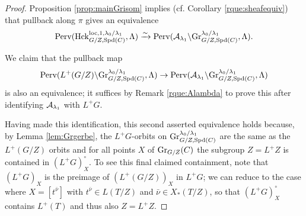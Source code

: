 \begin{proof}
   Proposition \ref{prop:mainGrisom} implies (cf. Corollary \ref{rque:sheafequiv}) that pullback along $\pi$ gives an equivalence 
    \begin{equation*}
    \textnormal{Perv}(\mathrm{Hck}^{\mathrm{loc},1,\lambda_{0}/\lambda_{1}}_{G/Z,\mathrm{Spd}(C)},\Lambda) \xrightarrow{\sim} \textnormal{Perv}(\mathcal{A}_{\lambda_{1}} \backslash \textnormal{Gr}_{G/Z,\mathrm{Spd}(C)}^{\lambda_{0}/\lambda_{1}},\Lambda).
\end{equation*}

We claim that the pullback map
\begin{equation*}
  \textnormal{Perv}(L^{+}(G/Z) \backslash \textnormal{Gr}_{G/Z,\mathrm{Spd}(C)}^{\lambda_{0}/\lambda_{1}},\Lambda)  \to \textnormal{Perv}(\mathcal{A}_{\lambda_{1}} \backslash \textnormal{Gr}_{G/Z,\mathrm{Spd}(C)}^{\lambda_{0}/\lambda_{1}},\Lambda)
\end{equation*}
is also an equivalence; it suffices by Remark \ref{rque:Alambda} to prove this after identifying $\mathcal{A}_{\lambda_{1}}$ with $L^{+}G$. 

Having made this identification, this second asserted equivalence holds because, by Lemma \ref{lem:Grgerbe}, the $L^{+}G$-orbits on $\textnormal{Gr}_{G/Z,\mathrm{Spd}(C)}^{\lambda_{0}/\lambda_{1}}$
are the same as the $L^{+}(G/Z)$ orbits and for all points $X$ of $\textnormal{Gr}_{G/Z}(C)$ the subgroup $Z=L^{+}Z$ is contained in $(L^{+}G)_{X}^{\circ}$. To see this final claimed containment, note that $(L^{+}G)_{X}$ is the preimage of $(L^{+}(G/Z))_{X}$ in $L^{+}G$; we can reduce to the case where $X = [t^{\bar{\nu}}]$ with $t^{\bar{\nu}} \in L(T/Z)$ and $\bar{\nu} \in X_{*}(T/Z)$, so that $(L^{+}G)^{\circ}_{X}$ contains $L^{+}(T)$ and thus also $Z = L^{+}Z$. 
\end{proof}

